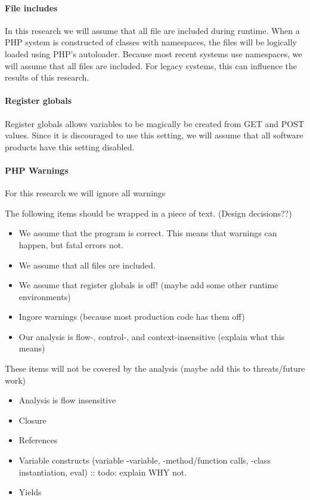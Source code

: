 \documentclass[../main.tex]{subfiles}
\begin{document}
    \paragraph{File includes}
    In this research we will assume that all file are included during runtime. 
    When a PHP system is constructed of classes with namespaces, the files will be logically loaded using PHP's autoloader.
    Because most recent systems use namespaces, we will assume that all files are included.
    For legacy systems, this can influence the results of this research.
    
    \paragraph{Register globals}
    Register globals allows variables to be magically be created from GET and POST values.
    Since it is discouraged to use this setting, we will assume that all software products have this setting disabled.
    
    \paragraph{PHP Warnings}
    For this research we will ignore all warnings
    
    The following items should be wrapped in a piece of text. (Design decisions??)
    \begin{itemize}
        \item We assume that the program is correct. This means that warnings can happen, but fatal errors not.
        \item We assume that all files are included.
        \item We assume that register globals is off! (maybe add some other runtime environments)
        \item Ingore warnings (because most production code has them off)
        \item Our analysis is flow-, control-, and context-insensitive (explain what this means)
    \end{itemize}
    These items will not be covered by the analysis (maybe add this to threats/future work)
    \begin{itemize}
        \item Analysis is flow insensitive
        \item Closure
        \item References
        \item Variable constructs (variable -variable, -method/function calls, -class instantiation, eval) :: todo: explain WHY not.
        \item Yields
    \end{itemize}
\end{document}
